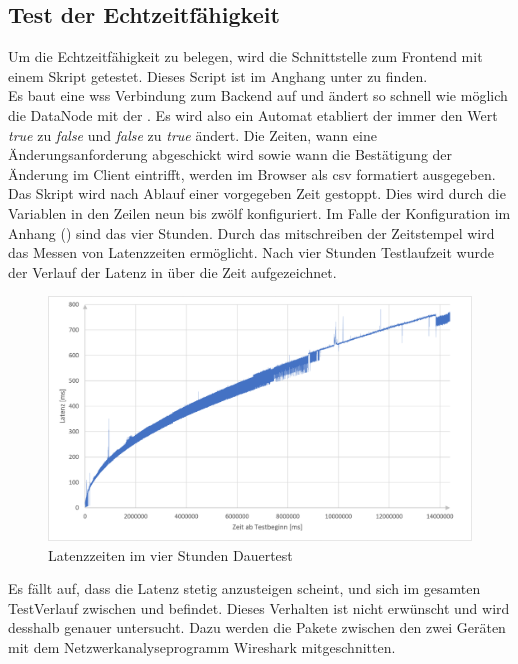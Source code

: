 \subsection{Test der Echtzeitfähigkeit}
Um die Echtzeitfähigkeit zu belegen, wird die Schnittstelle zum Frontend mit einem Skript getestet.
Dieses Script ist im Anghang unter  zu finden. 
\\Es baut eine \ac{wss} Verbindung zum Backend auf und ändert so schnell wie möglich die DataNode mit der .
Es wird also ein Automat etabliert der immer den Wert \emph{true} zu \emph{false} und \emph{false} zu \emph{true} ändert.
Die Zeiten, wann eine Änderungsanforderung abgeschickt wird sowie wann die Bestätigung der Änderung im Client eintrifft, 
werden im Browser als \ac{csv} formatiert ausgegeben. Das Skript wird nach Ablauf einer vorgegeben Zeit gestoppt. 
Dies wird durch die Variablen in den Zeilen neun bis zwölf konfiguriert. 
Im Falle der Konfiguration im Anhang () sind das vier Stunden.
Durch das mitschreiben der Zeitstempel wird das Messen von Latenzzeiten ermöglicht.
Nach vier Stunden Testlaufzeit wurde der Verlauf der Latenz in  über die Zeit aufgezeichnet.
\begin{figure}[ht]
  \centering
  \includegraphics[width=\textwidth]{content/hauptteil/umsetzungPoC/pocTest/res/LatenzNormal4h.pdf}
  \caption{Latenzzeiten im vier Stunden Dauertest}
  \label{fig:testing:latency4hNorm}
\end{figure}
Es fällt auf, dass die Latenz stetig anzusteigen scheint, und sich im gesamten TestVerlauf zwischen  und  befindet.
Dieses Verhalten ist nicht erwünscht und wird desshalb genauer untersucht.
Dazu werden die Pakete zwischen den zwei Geräten mit dem Netzwerkanalyseprogramm Wireshark \citep{wireshark:program} mitgeschnitten.
